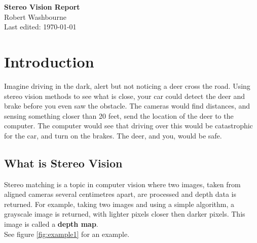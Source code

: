 \documentclass[11pt,fleqn]{article}
\begin{document}
\begin{center}
\Large{\textbf{Stereo Vision Report}}\\[5pt]
\large{Robert Washbourne}\\
Last edited: \today
\end{center}

\tableofcontents
\listoffigures
\newpage

\section{Introduction}

Imagine driving in the dark, alert but not noticing a deer cross the road. Using stereo vision methods to see what is close, your car could detect the deer and brake before you even saw the obstacle. The cameras would find distances, and sensing something closer than 20 feet, send the location of the deer to the computer. The computer would see that driving over this would be catastrophic for the car, and turn on the brakes. The deer, and you, would be safe.

\subsection{What is Stereo Vision}

Stereo matching is a topic in computer vision where two images, taken from aligned cameras several centimetres apart, are processed and depth data is returned. For example, taking two images and using a simple algorithm, a grayscale image is returned, with lighter pixels closer then darker pixels. This image is called a \textbf{depth map}.\\[6pt]
%
See figure \ref{fig:example1} for an example.
\end{document}
